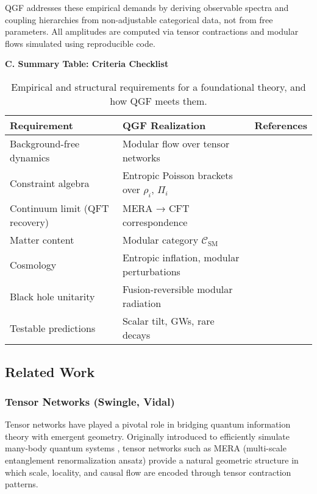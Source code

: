 \documentclass[11pt]{article}
\begin{document}
QGF addresses these empirical demands by deriving observable spectra and coupling hierarchies from non-adjustable categorical data, not from free parameters. All amplitudes are computed via tensor contractions and modular flows simulated using reproducible code.

\vspace{0.8em}
\noindent\textbf{C. Summary Table: Criteria Checklist}

\begin{table}[H]
\centering
\renewcommand{\arraystretch}{1.3}
\begin{tabular}{|p{4.8cm}|p{6.2cm}|p{3.5cm}|}
\hline
\textbf{Requirement} & \textbf{QGF Realization} & \textbf{References} \\
\hline
Background-free dynamics & Modular flow over tensor networks & \cite{Haegeman2013, Tomita1967} \\
\hline
Constraint algebra & Entropic Poisson brackets over \( \rho_i \), \( \Pi_i \) & \cite{Arnowitt2008} \\
\hline
Continuum limit (QFT recovery) & MERA → CFT correspondence & \cite{Evenbly2011, Swingle2012} \\
\hline
Matter content & Modular category \( \mathcal{C}_{\text{SM}} \) & \cite{Rowell2009, Ostrik2002} \\
\hline
Cosmology & Entropic inflation, modular perturbations & \cite{Planck2018, BICEP2021} \\
\hline
Black hole unitarity & Fusion-reversible modular radiation & \cite{Hawking1975, Bisognano1976} \\
\hline
Testable predictions & Scalar tilt, GWs, rare decays & \cite{Jacobson1995, Kong2014} \\
\hline
\end{tabular}
\caption{Empirical and structural requirements for a foundational theory, and how QGF meets them.}
\label{tab:qgf-criteria}
\end{table}

\subsection{Related Work}

\subsubsection{Tensor Networks (Swingle, Vidal)}

Tensor networks have played a pivotal role in bridging quantum information theory with emergent geometry. Originally introduced to efficiently simulate many-body quantum systems \cite{Vidal2007, Vidal2008}, tensor networks such as MERA (multi-scale entanglement renormalization ansatz) provide a natural geometric structure in which scale, locality, and causal flow are encoded through tensor contraction patterns.
\end{document}
